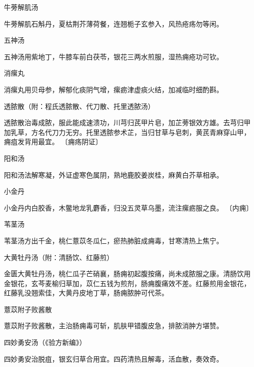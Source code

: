 \documentclass[a4paper,12pt,UTF8,twoside]{ctexbook}
\begin{document}
牛蒡解肌汤

牛蒡解肌石斛丹，夏枯荆芥薄荷餐，连翘栀子玄参入，风热疮疡勿等闲。

五神汤

五神汤用紫地丁，牛膝车前白茯苓，银花三两水煎服，湿热痈疮功可钦。

消瘰丸

消瘰丸用贝母参，解郁化痰阴气增，瘰疬津虚痰火结，加减临时细酌斟。

透脓散（附：程氏透脓散、代刀散、托里透脓汤）

透脓散治毒成脓，服此能成速溃功，川芎归芪甲片皂，加芷蒡银效方雄。去芎归甲加乳草，方名代刀力无穷。托里透脓参术芷，当归甘草与皂刺，黄芪青麻穿山甲，痈疽发背用最宜。
〔痈疡阴证〕

阳和汤

阳和汤法解寒凝，外证虚寒色属阴，熟地鹿胶姜炭桂，麻黄白芥草相承。

小金丹

小金丹内白胶香，木鳖地龙乳麝香，归没五灵草乌墨，流注瘰疬服之良。
〔内痈〕

苇茎汤

苇茎汤方出千金，桃仁薏苡冬瓜仁，瘀热肺脏成痈毒，甘寒清热上焦宁。

大黄牡丹汤（附：清肠饮、红藤煎）

金匮大黄牡丹汤，桃仁瓜子芒硝襄，肠痈初起腹按痛，尚未成脓服之康。清肠饮用金银花，玄芩麦榆归草加，苡仁五钱为煎剂，肠痈腹痛效不差。红藤煎用金银花，红藤乳没翘索佳，大黄丹皮地丁草，肠痈脓肿可代茶。

薏苡附子败酱散

薏苡附子败酱散，主治肠痈毒可斩，肌肤甲错腹皮急，排脓消肿方堪赞。

四妙勇安汤（《验方新编》）

四妙勇安治脱疽，银玄归草合用宜。四药清热且解毒，活血散，奏效奇。


\backmatter
\end{document}
